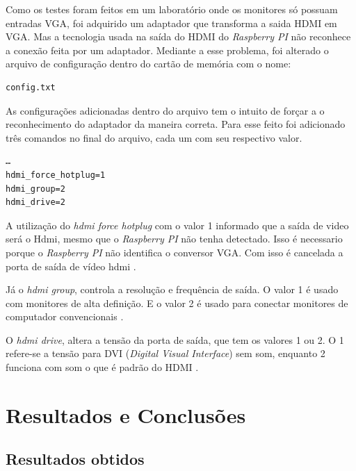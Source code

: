 \documentclass[
	12pt,				%
	openright,			%
	twoside,			%
	a4paper,			%
	chapter=TITLE,		%
	english,			%
	brazil				%
	]{abntex2}
\begin{document}
Como os testes foram feitos em um laboratório onde os monitores só possuam entradas VGA, foi adquirido um adaptador que transforma a saida HDMI em VGA. Mas a tecnologia usada na saída do HDMI do \textit{Raspberry PI} não reconhece a conexão feita por um adaptador. Mediante a esse problema, foi alterado o arquivo de configuração dentro do cartão de memória com o nome:
\begin{verbatim}
config.txt
\end{verbatim}
As configurações adicionadas dentro do arquivo tem o intuito de forçar a o reconhecimento do adaptador da maneira correta. Para esse feito foi adicionado três comandos no final do arquivo, cada um com seu respectivo valor. 
\begin{verbatim}
…
hdmi_force_hotplug=1
hdmi_group=2
hdmi_drive=2
\end{verbatim}
A utilização do \textit{hdmi force hotplug} com o valor 1 informado que a saída de video será o Hdmi, mesmo que o \textit{Raspberry PI} não tenha detectado. Isso é necessario porque o \textit{Raspberry PI} não identifica o conversor VGA. Com isso é cancelada a porta de saída de vídeo hdmi \cite{vga}.  

Já o \textit{hdmi group}, controla a resolução e frequência de saída. O valor 1 é usado com monitores de alta definição. E o valor 2 é usado para  conectar monitores de computador convencionais \cite{vga}. 

O \textit{hdmi drive}, altera a tensão da porta de saída, que tem os valores 1 ou 2. O 1 refere-se a tensão para DVI (\textit{Digital Visual Interface}) sem som, enquanto 2 funciona com som o que é padrão do HDMI \cite{vga}. 






\part{Resultados e Conclusões}

\chapter{Resultados obtidos}
\label{result}
\end{document}
